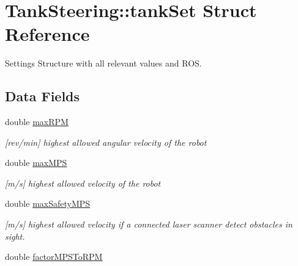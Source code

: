 \hypertarget{structTankSteering_1_1tankSet}{\section{Tank\-Steering\-:\-:tank\-Set Struct Reference}
\label{structTankSteering_1_1tankSet}
}


Settings Structure with all relevant values and R\-O\-S.  


\subsection*{Data Fields}
\begin{DoxyCompactItemize}
\item 
\hypertarget{structTankSteering_1_1tankSet_a0f3c7547f093cd0f8ca66016bca46cd2}{double \hyperlink{structTankSteering_1_1tankSet_a0f3c7547f093cd0f8ca66016bca46cd2}{max\-R\-P\-M}}\label{structTankSteering_1_1tankSet_a0f3c7547f093cd0f8ca66016bca46cd2}

\begin{DoxyCompactList}\small\item\em \mbox{[}rev/min\mbox{]} highest allowed angular velocity of the robot \end{DoxyCompactList}\item 
\hypertarget{structTankSteering_1_1tankSet_a07b9b99e1d4d281a8ffc6cca8cebfcfa}{double \hyperlink{structTankSteering_1_1tankSet_a07b9b99e1d4d281a8ffc6cca8cebfcfa}{max\-M\-P\-S}}\label{structTankSteering_1_1tankSet_a07b9b99e1d4d281a8ffc6cca8cebfcfa}

\begin{DoxyCompactList}\small\item\em \mbox{[}m/s\mbox{]} highest allowed velocity of the robot \end{DoxyCompactList}\item 
double \hyperlink{structTankSteering_1_1tankSet_ab604472ee21a35336e7be92ed0a9616f}{max\-Safety\-M\-P\-S}
\begin{DoxyCompactList}\small\item\em \mbox{[}m/s\mbox{]} highest allowed velocity if a connected laser scanner detect obstacles in sight. \end{DoxyCompactList}\item 
\hypertarget{structTankSteering_1_1tankSet_a895d3b886f7c964e6eb2eb97c3254be0}{double \hyperlink{structTankSteering_1_1tankSet_a895d3b886f7c964e6eb2eb97c3254be0}{factor\-M\-P\-S\-To\-R\-P\-M}}\label{structTankSteering_1_1tankSet_a895d3b886f7c964e6eb2eb97c3254be0}


\end{DoxyCompactItemize}
